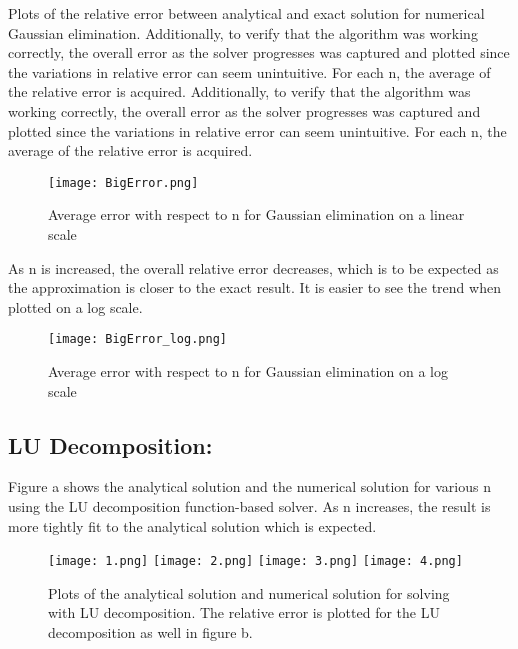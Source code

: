 \documentclass[12pt]{article}
\begin{document}
Plots of the relative error between analytical and exact solution for numerical Gaussian elimination. Additionally, to verify that the algorithm was working correctly, the overall error as the solver progresses was captured and plotted since the variations in relative error can seem unintuitive. For each n, the average of the relative error is acquired. Additionally, to verify that the algorithm was working correctly, the overall error as the solver progresses was captured and plotted since the variations in relative error can seem unintuitive. For each n, the average of the relative error is acquired.\\

\begin{figure}[H]
	\centering
	\graphicspath{{~/GitHub/sayboltm/PHY480/Project1/Report/Precision/Gauss/} {c:/Users/charl/Documents/Precision/Gauss/}{C:/Users/Mike/Documents/GitHub/sayboltm/PHY480/Project1/Report/Precision/Gauss/}}
	\texttt{[image: BigError.png]}
	\caption{Average error with respect to n for Gaussian elimination on a linear scale}
\end{figure}
 \pagebreak
As n is increased, the overall relative error decreases, which is to be expected as the approximation is closer to the exact result. It is easier to see the trend when plotted on a log scale.\\

\begin{figure}[H]
\centering
\graphicspath{{~/GitHub/sayboltm/PHY480/Project1/Report/Precision/Gauss/} {c:/Users/charl/Documents/Precision/Gauss/}{C:/Users/Mike/Documents/GitHub/sayboltm/PHY480/Project1/Report/Precision/Gauss/}}
\texttt{[image: BigError\_log.png]}
\caption{Average error with respect to n for Gaussian elimination on a log scale}
\end{figure}

\subsection{LU Decomposition:}
Figure a shows the analytical solution and the numerical solution for various n using the LU decomposition function-based solver. As n increases, the result is more tightly fit to the analytical solution which is expected.\\

\begin{figure}[H]
\centering
\graphicspath{{~/GitHub/sayboltm/PHY480/Project1/Report/Precision/LU/} {c:/Users/charl/Documents/Precision/LU/}{C:/Users/Mike/Documents/GitHub/sayboltm/PHY480/Project1/Report/Precision/LU/}}
\texttt{[image: 1.png]}
\texttt{[image: 2.png]}
\texttt{[image: 3.png]}
\texttt{[image: 4.png]}\\
\centering
\caption{Plots of the analytical solution and numerical solution for solving with LU decomposition. The relative error is plotted for the LU decomposition as well in figure b.}
\end{figure}
\end{document}
